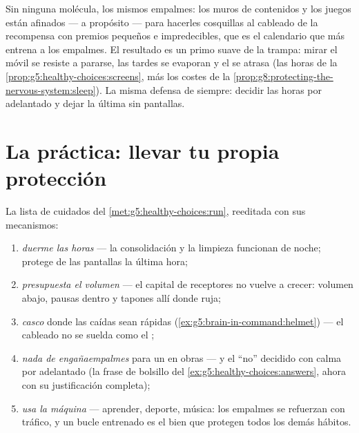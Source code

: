\begin{example}\label{ex:g8:protecting-the-nervous-system:screens}
Sin ninguna molécula, los mismos empalmes: los muros de contenidos y
los juegos están afinados --- a propósito --- para hacerles cosquillas
al cableado de la recompensa con premios pequeños e impredecibles, que
es el calendario que más entrena a los empalmes. El resultado es un
primo suave de la trampa: mirar el móvil se resiste a pararse, las
tardes se evaporan y el  se atrasa (las horas de la
\cref{prop:g5:healthy-choices:screens}, más los costes de la
\cref{prop:g8:protecting-the-nervous-system:sleep}). La misma defensa
de siempre: decidir las horas por adelantado y dejar la última sin
pantallas.
\end{example}

\section{La práctica: llevar tu propia protección}

\begin{method}\label{met:g8:protecting-the-nervous-system:manual}
La lista de cuidados del \cref{met:g5:healthy-choices:run}, reeditada
con sus mecanismos:
\begin{enumerate}
  \item \emph{duerme las horas} --- la consolidación y la limpieza
        funcionan de noche; protege de las pantallas la última hora;
  \item \emph{presupuesta el volumen} --- el capital de receptores no
        vuelve a crecer: volumen abajo, pausas dentro y tapones allí
        donde ruja;
  \item \emph{casco} donde las caídas sean rápidas
        (\cref{ex:g5:brain-in-command:helmet}) --- el cableado no se
        suelda como el ;
  \item \emph{nada de engañaempalmes} para un  en obras --- y el
        ``no'' decidido con calma por adelantado (la frase de bolsillo
        del \cref{ex:g5:healthy-choices:answers}, ahora con su
        justificación completa);
  \item \emph{usa la máquina} --- aprender, deporte, música: los
        empalmes se refuerzan con tráfico, y un bucle entrenado es el
        bien que protegen todos los demás hábitos.
\end{enumerate}
\end{method}

